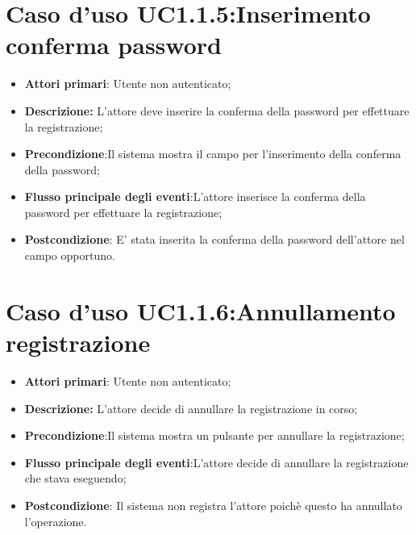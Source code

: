 {{{\section{Caso d'uso UC1.1.5:Inserimento  conferma password}
\begin{itemize}
	\item \textbf{Attori primari}: Utente non autenticato;
	\item \textbf{Descrizione:} L'attore deve inserire la conferma della password per effettuare la registrazione;
	\item \textbf{Precondizione}:Il sistema mostra il campo per l'inserimento della conferma della password;
	\item \textbf{Flusso principale degli eventi}:L'attore inserisce la conferma della password per effettuare la registrazione;
	\item \textbf{Postcondizione}: E' stata inserita la conferma della password dell'attore nel campo opportuno.
\end{itemize}

\section{Caso d'uso UC1.1.6:Annullamento registrazione}
\begin{itemize}
	\item \textbf{Attori primari}: Utente non autenticato;
	\item \textbf{Descrizione:} L'attore decide di annullare la registrazione in corso;
	\item \textbf{Precondizione}:Il sistema mostra un pulsante per annullare la  registrazione;
	\item \textbf{Flusso principale degli eventi}:L'attore decide di annullare la registrazione che stava eseguendo;
	\item \textbf{Postcondizione}: Il sistema non registra l'attore poichè questo ha annullato l'operazione.
\end{itemize}

}}}
